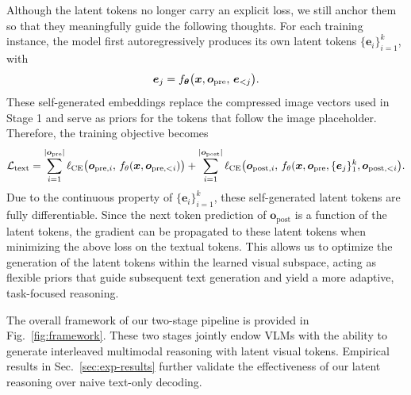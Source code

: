 Although the latent tokens no longer carry an explicit loss, we still anchor them so that they meaningfully guide the following thoughts. For each training instance, the model first autoregressively produces its own latent tokens $\{\bm e_i\}_{i=1}^{k}$, with
\begin{equation}
\bm e_{j}=f_{\bm \theta}\bigl(\bm x, \bm o_{\rm pre},\, \bm e_{<j} \bigr).
\end{equation}
These self-generated embeddings replace the compressed image vectors used in Stage 1 and serve as priors for the tokens that follow the image placeholder. Therefore, the training objective becomes
\begin{equation}
    \begin{aligned}
        \mathcal{L}_{\rm text} = 
        \sum_{i=1}^{|\bm o_{\rm pre}|}\ell_{\rm CE}\bigl(\bm o_{\mathrm{pre}, i},\,f_{\theta}(\bm x, \bm o_{\mathrm{pre}, <i})\bigr)
        + \sum_{i=1}^{|\bm o_{\mathrm{post}}|}\ell_{\rm CE}\bigl(\bm o_{\mathrm{post}, i},\,f_{\theta}(\bm x, \bm o_{\mathrm{pre}}, \{\bm e_{j}\}_{1}^{k},\bm o_{\mathrm{post}, <i}\bigr).
    \end{aligned}
\end{equation}
Due to the continuous property of $\{\bm e_i\}_{i=1}^{k}$, these self-generated latent tokens are fully differentiable.
Since the next token prediction of $\bm o_{\mathrm{post}}$ is a function of the latent tokens, the gradient can be propagated to these latent tokens when minimizing the above loss on the textual tokens.
This allows us to optimize the generation of the latent tokens within the learned visual subspace, acting as flexible priors that guide subsequent text generation and yield a more adaptive, task-focused reasoning.

The overall framework of our two-stage pipeline is provided in Fig.~\ref{fig:framework}. These two stages jointly endow VLMs with the ability to generate interleaved multimodal reasoning with latent visual tokens. Empirical results in Sec.~\ref{sec:exp-results} further validate the effectiveness of our latent reasoning over naive text-only decoding. 

